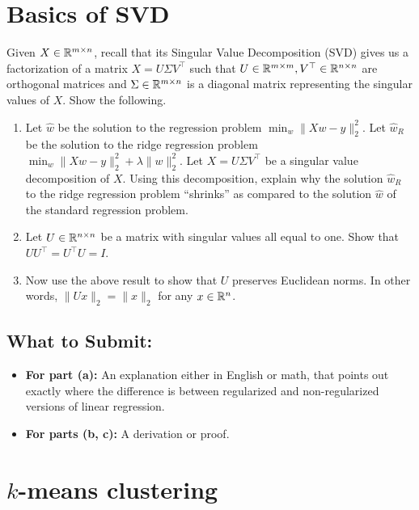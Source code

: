 \documentclass{article}
\begin{document}
\section*{Basics of SVD}
\begin{aprob}
  Given $X \in \mathbb{R}^{m \times n}$, recall that its Singular Value Decomposition (SVD) gives us a factorization of a matrix $X = U \Sigma V^\top$ such that $U \in \mathbb{R}^{m \times m}, V^\top \in \mathbb{R}^{n \times n}$ are orthogonal matrices and $\Sigma \in \mathbb{R}^{m \times n}$ is a diagonal matrix representing the singular values of $X$.
  Show the following.
  \begin{enumerate}
    \item {} Let $\widehat{w}$ be the solution to the regression problem $\min_{w} \|Xw - y\|_2^2$. Let $\widehat{w}_R$ be the solution to the ridge regression problem $\min_w \|X w - y\|_2^2 + \lambda \|w\|_2^2$. Let $X = U \Sigma V^\top$ be a singular value decomposition of $X$. Using this decomposition, explain why the solution $\widehat{w}_R$ to the ridge regression problem ``shrinks'' as compared to the solution $\widehat{w}$ of the standard regression problem. 
    \item {} Let $U \in \mathbb{R}^{n\times n}$ be a matrix with singular values all equal to one. Show that $UU^\top = U^\top U = I$.
    \item {} Now use the above result to show that $U$ preserves Euclidean norms. In other words, $\|U x\|_2 = \|x\|_2$ for any $x\in \mathbb{R}^n$.   
  \end{enumerate}
  
  \subsection*{What to Submit:}
    \begin{itemize}
        \item \textbf{For part (a):} An explanation either in English or math, that points out exactly where the difference is
between regularized and non-regularized versions of linear regression.
        \item \textbf{For parts (b, c):} A derivation or proof.
    \end{itemize}
  
\end{aprob}

\newpage

\section*{$k$-means clustering}
\end{document}
